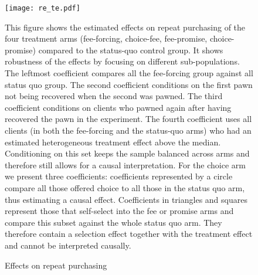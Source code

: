 \documentclass[oneside,11pt]{article}
\begin{document}
\vspace{.3in}
\begin{figure}[H]
        \caption{Effects on repeat purchasing}
    \label{reincidence}
    \begin{center}
        \centering
        \texttt{[image: re\_te.pdf]}
    \end{center}
     \scriptsize This figure shows the estimated effects on repeat purchasing of the four treatment arms (fee-forcing, choice-fee, fee-promise, choice-promise) compared to the status-quo control group. It shows robustness of the effects by focusing on different sub-populations. The leftmost coefficient compares all the fee-forcing group against all status quo group. The second coefficient conditions on the first pawn not being recovered when the second was pawned. The third coefficient conditions on clients who pawned again after having recovered the pawn in the experiment. The fourth coefficient uses all clients (in both the fee-forcing and the status-quo arms) who had an estimated heterogeneous treatment effect above the median. Conditioning on this set keeps the sample balanced across arms and therefore still allows for a causal interpretation. For the choice arm we present three coefficients: coefficients represented by a circle compare all those offered choice to all those in the status quo arm, thus estimating a causal effect. Coefficients in triangles and squares represent those that self-select into the fee or promise arms and compare this subset against the whole status quo arm. They therefore contain a selection effect together with the treatment effect and cannot be interpreted causally.
\end{figure}
\end{document}
